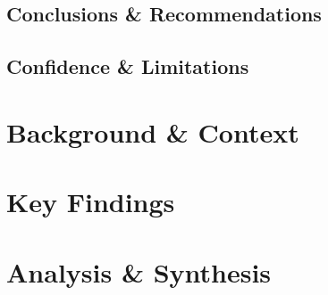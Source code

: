 \documentclass[11pt]{article}
\begin{document}
\subsection{Conclusions \& Recommendations}

\subsection{Confidence \& Limitations}

\section{Background \& Context}

\section{Key Findings}

\section{Analysis \& Synthesis}
\end{document}
